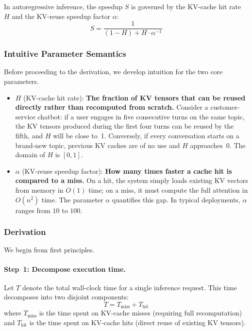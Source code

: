\begin{heuristic}
In autoregressive inference, the speedup $S$ is governed by the KV-cache hit rate $H$ and the KV-reuse speedup factor $\alpha$:
\begin{equation}
\label{eq:locality}
S = \frac{1}{(1-H) + H \cdot \alpha^{-1}}
\end{equation}
\end{heuristic}

\subsubsection{Intuitive Parameter Semantics}

Before proceeding to the derivation, we develop intuition for the two core parameters.

\begin{itemize}[nosep]
\item $H$ (KV-cache hit rate): \textbf{The fraction of KV tensors that can be reused directly rather than recomputed from scratch.} Consider a customer-service chatbot: if a user engages in five consecutive turns on the same topic, the KV tensors produced during the first four turns can be reused by the fifth, and $H$ will be close to~1. Conversely, if every conversation starts on a brand-new topic, previous KV caches are of no use and $H$ approaches~0. The domain of $H$ is $[0, 1]$.

\item $\alpha$ (KV-reuse speedup factor): \textbf{How many times faster a cache hit is compared to a miss.} On a hit, the system simply loads existing KV vectors from memory in $O(1)$ time; on a miss, it must compute the full attention in $O(n^{2})$ time. The parameter $\alpha$ quantifies this gap. In typical deployments, $\alpha$ ranges from $10$ to $100$.
\end{itemize}

\subsubsection{Derivation}

We begin from first principles.

\paragraph{Step~1: Decompose execution time.}
Let $T$ denote the total wall-clock time for a single inference request. This time decomposes into two disjoint components:
\begin{equation}
T = T_{\mathrm{miss}} + T_{\mathrm{hit}}
\end{equation}
where $T_{\mathrm{miss}}$ is the time spent on KV-cache misses (requiring full recomputation) and $T_{\mathrm{hit}}$ is the time spent on KV-cache hits (direct reuse of existing KV tensors).


